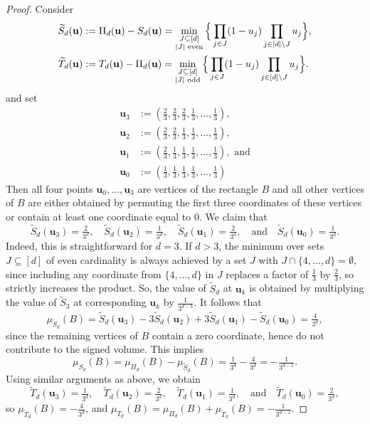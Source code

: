 \documentclass[12pt,a4paper]{amsart}
\theoremstyle{definition}
\begin{document}
\begin{proof}
Consider
    \begin{align*}
        \widetilde{S}_d(\mathbf{u}) &:= \Pi_d(\mathbf{u}) - S_d(\mathbf{u}) = \min_{\substack{J \subseteq [d]\\ |J| \textup{ even}}} \Big\{\prod_{j \in J} (1-u_j) \prod_{j \in [d] \setminus J} u_j\Big\},\\
        \widetilde{T}_d(\mathbf{u}) &:= T_d(\mathbf{u}) - \Pi_d(\mathbf{u}) = \min_{\substack{J \subseteq [d]\\ |J| \textup{ odd}}} \Big\{\prod_{j \in J} (1-u_j) \prod_{j \in [d] \setminus J} u_j\Big\}.
    \end{align*}
and set
    \begin{align*}
        \mathbf{u}_3 &:= (\tfrac23, \tfrac23, \tfrac23, \tfrac13, \ldots, \tfrac13), \\
        \mathbf{u}_2 &:= (\tfrac23, \tfrac23, \tfrac13, \tfrac13, \ldots, \tfrac13), \\
        \mathbf{u}_1 &:= (\tfrac23, \tfrac13, \tfrac13, \tfrac13, \ldots, \tfrac13), \text{ and}\\
        \mathbf{u}_0 &:= (\tfrac13, \tfrac13, \tfrac13, \tfrac13, \ldots, \tfrac13)
    \end{align*}
Then all four points $\mathbf{u}_0,\ldots,\mathbf{u}_3$ are vertices of the 
rectangle $B$ and all other vertices of $B$ are either obtained by permuting the first three coordinates of these vertices or contain at least one coordinate equal to $0$. We claim that
$$ \widetilde{S}_d(\mathbf{u}_3) = \tfrac{2}{3^d}, \quad \widetilde{S}_d(\mathbf{u}_2) = \tfrac{1}{3^d}, \quad 
        \widetilde{S}_d(\mathbf{u}_1) = \tfrac{2}{3^d}, \quad  \text{and} \quad \widetilde{S}_d(\mathbf{u}_0) = \tfrac{1}{3^d}. $$
Indeed, this is straightforward for $d=3$. If $d > 3$, the minimum over sets $J \subseteq [d]$ of even cardinality
is always achieved by a set $J$ with $J \cap \{4, ..., d\} = \emptyset$, since including any coordinate from $\{4, ..., d\}$
in $J$ replaces a factor of $\tfrac13$ by $\tfrac23$, so strictly increases the product. So, the value of $\widetilde{S}_d$ at $\mathbf{u}_k$ is obtained by multiplying the value of $\widetilde{S}_3$ at corresponding $\mathbf{u}_k$ by $\tfrac{1}{3^{d-3}}$.
It follows that 
$$ \mu_{\widetilde{S}_d}(B) = \widetilde{S}_d(\mathbf{u}_3) - 3\widetilde{S}_d(\mathbf{u}_2) + 3\widetilde{S}_d(\mathbf{u}_1) - \widetilde{S}_d(\mathbf{u}_0) = \tfrac{4}{3^d},$$
since the remaining vertices of $B$ contain a zero coordinate, hence do not contribute to the
signed volume. This implies
$$ \mu_{S_d}(B) = \mu_{\Pi_d}(B) - \mu_{\widetilde{S}_d}(B) = \tfrac{1}{3^d} - \tfrac{4}{3^d} = -\tfrac{1}{3^{d-1}}.$$
Using similar arguments as above, we obtain
$$ \widetilde{T}_d(\mathbf{u}_3) = \tfrac{1}{3^d}, \quad \widetilde{T}_d(\mathbf{u}_2) = \tfrac{2}{3^d}, \quad 
        \widetilde{T}_d(\mathbf{u}_1) = \tfrac{1}{3^d}, \quad  \text{and} \quad \widetilde{T}_d(\mathbf{u}_0) = \tfrac{2}{3^d}, $$
so $\mu_{\widetilde{T}_d}(B) = -\tfrac{4}{3^d}$, and $\mu_{T_d}(B) = \mu_{\Pi_d}(B) + \mu_{\widetilde{T}_d}(B) = -\tfrac{1}{3^{d-1}}.$
\end{proof}
\end{document}
